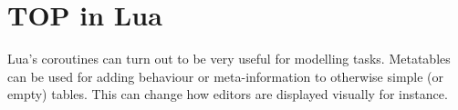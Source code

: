\section{TOP in Lua}\label{section-top-lua}
Lua's coroutines can turn out to be very useful for modelling tasks. Metatables can be used for adding behaviour or meta-information to otherwise simple (or empty) tables. This can change how editors are displayed visually for instance. 
